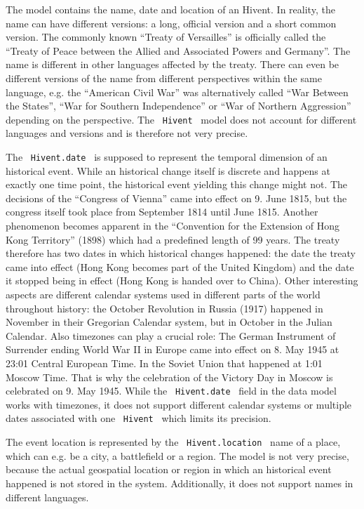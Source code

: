 The model contains the name, date and location of an Hivent. In reality, the name can have different versions: a long, official version and a short common version. The commonly known ``Treaty of Versailles'' is officially called the ``Treaty of Peace between the Allied and Associated Powers and Germany''. The name is different in other languages affected by the treaty. There can even be different versions of the name from different perspectives within the same language, e.g. the ``American Civil War'' was alternatively called ``War Between the States'', ``War for Southern Independence'' or ``War of Northern Aggression'' depending on the perspective.
The ~\texttt{Hivent}~ model does not account for different languages and versions and is therefore not very precise.

The ~\texttt{Hivent.date}~ is supposed to represent the temporal dimension of an historical event. While an historical change itself is discrete and happens at exactly one time point, the historical event yielding this change might not. The decisions of the ``Congress of Vienna'' came into effect on 9. June 1815, but the congress itself took place from September 1814 until June 1815. Another phenomenon becomes apparent in the ``Convention for the Extension of Hong Kong Territory'' (1898) which had a predefined length of 99 years. The treaty therefore has two dates in which historical changes happened: the date the treaty came into effect (Hong Kong becomes part of the United Kingdom) and the date it stopped being in effect (Hong Kong is handed over to China). Other interesting aspects are different calendar systems used in different parts of the world throughout history: the October Revolution in Russia (1917) happened in November in their Gregorian Calendar system, but in October in the Julian Calendar. Also timezones can play a crucial role: The German Instrument of Surrender ending World War II in Europe came into effect on 8. May 1945 at 23:01 Central European Time. In the Soviet Union that happened at 1:01 Moscow Time. That is why the celebration of the Victory Day in Moscow is celebrated on 9. May 1945. While the ~\texttt{Hivent.date}~ field in the data model works with timezones, it does not support different calendar systems or multiple dates associated with one ~\texttt{Hivent}~ which limits its precision.

The event location is represented by the ~\texttt{Hivent.location}~ name of a place, which can e.g. be a city, a battlefield or a region. The model is not very precise, because the actual geospatial location or region in which an historical event happened is not stored in the system. Additionally, it does not support names in different languages.

